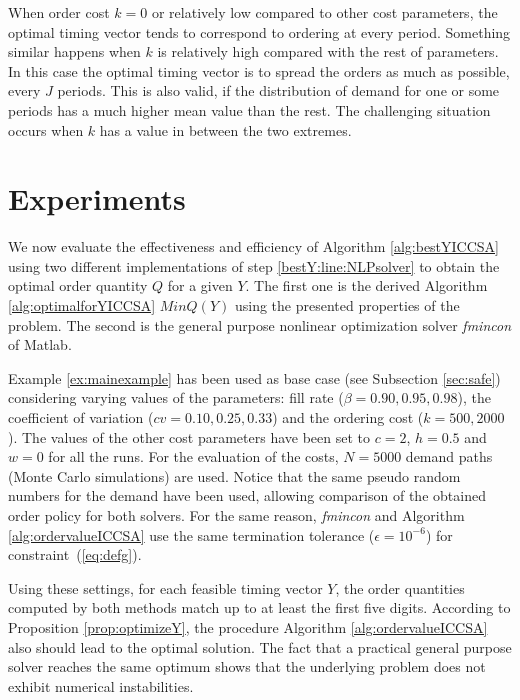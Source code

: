 {When order cost $k=0$ or relatively low compared to other cost parameters, the optimal timing vector tends to correspond to ordering at every period. Something similar happens when $k$ is relatively high compared with the rest of parameters. In this case the optimal timing vector is to spread the orders as much as possible, every $J$ periods. This is also valid, if the distribution of demand for one or some periods has a much higher mean value than the rest. The challenging situation occurs when $k$ has a value in between the two extremes.



\section{Experiments}
\label{sec:exp}

We now evaluate the effectiveness and efficiency of Algorithm \ref{alg:bestYICCSA} using two different implementations of step \ref{bestY:line:NLPsolver} to obtain the optimal order quantity $Q$ for a given $Y$. The first one is the derived Algorithm \ref{alg:optimalforYICCSA} $MinQ(Y)$ using the presented properties of the problem. The second is the general purpose nonlinear optimization solver \emph{fmincon} of Matlab.

Example \ref{ex:mainexample} has been used as base case (see Subsection \ref{sec:safe}) considering varying values of the parameters: fill rate ($\beta=0.90, 0.95,0.98$), the coefficient of variation ($cv=0.10, 0.25, 0.33$) and the ordering cost ($k=500, 2000$). The values of the other cost parameters have been set to $c=2$, $h=0.5$ and $w=0$ for all the runs. For the evaluation of the costs,  $N=5000$ demand paths (Monte Carlo simulations) are used. Notice that the same pseudo random numbers for the demand have been used, allowing comparison of the obtained order policy for both solvers. For the same reason,  \emph{fmincon} and Algorithm  \ref{alg:ordervalueICCSA}  use the same termination tolerance ($\epsilon=10^{-6}$)  for constraint~(\ref{eq:defg}).

Using these settings, for each feasible timing vector $Y$, the order quantities computed by both methods match up to at least the first five digits. According to Proposition \ref{prop:optimizeY}, the procedure Algorithm  \ref{alg:ordervalueICCSA} also should lead to the optimal solution. The fact that a practical general purpose solver reaches the same optimum shows that the underlying problem does not exhibit numerical instabilities. 

}
